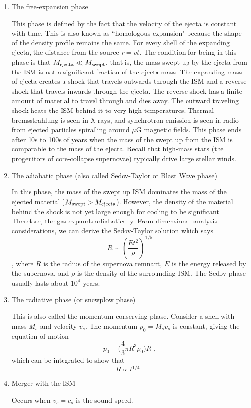 \begin{enumerate}
    \item The free-expansion phase

    This phase is defined by the fact that the velocity of the ejecta is constant with time. This is also known as ``homologous expansion" because the shape of the density profile remains the same. For every shell of the expanding ejecta, the distance from the source $r = vt$. The condition for being in this phase is that $M_{\rm ejecta} \ll M_{\rm swept}$, that is, the mass swept up by the ejecta from the ISM is not a significant fraction of the ejecta mass.
    The expanding mass of ejecta creates a shock that travels outwards through the ISM
    and a reverse shock that travels inwards through the ejecta.  The reverse shock has a finite
    amount of material to travel through and dies away.
    The outward traveling shock heats the ISM behind it to very high temperatures.
    Thermal bremsstrahlung is seen
    in X-rays, and synchrotron emission is seen in radio from ejected
    particles spiralling around $\mu$G magnetic fields.  This phase ends after 10s to 100s of
    years when the mass of the swept up from the ISM is comparable to the mass of the ejecta.
    Recall that high-mass stars (the progenitors of core-collapse supernovae) typically
    drive large stellar winds.

    \item The adiabatic phase (also called Sedov-Taylor or Blast Wave phase)

    In this phase, the mass of the swept up ISM dominates the mass of the ejected material ($M_{\rm swept} > M_{\rm ejecta}$).
    However, the density of the material behind the shock is not yet large enough for cooling
    to be significant.  Therefore, the gas expands adiabatically.
    From dimensional analysis considerations, we can derive the Sedov-Taylor solution which says
    \begin{dmath}
        R \sim \left(\frac{Et^2}{\rho}\right)^{1/5}
    \end{dmath},
    where $R$ is the radius of the supernova remnant, $E$ is the energy released by the
    supernova, and $\rho$ is the density of the surrounding ISM. The Sedov phase usually lasts about $10^4$ years.

    \item The radiative phase (or snowplow phase)
    
    This is also called the momentum-conserving phase. Consider a shell with mass $M_s$ and velocity $v_s$. The momentum $p_0 = M_s v_s$ is constant, giving the equation of motion
    \begin{equation}
    p_0 - \biggl(\frac{4}{3}\pi R^3 \rho_0 \biggr) \dot{R}\,\, ,
    \end{equation}
    which can be integrated to show that
    \begin{equation}
    R \propto t^{1/4}\,\,.
    \end{equation}
    \item Merger with the ISM
    
    Occurs when $v_s = c_s$ is the sound speed.
\end{enumerate}

